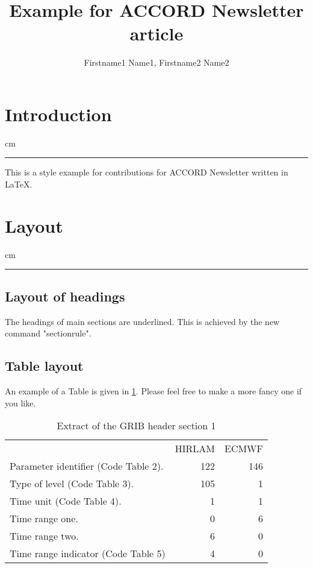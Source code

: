 \documentclass[11pt,a4paper]{article}
\date{}
\title{ Example for ACCORD Newsletter article}
\author{Firstname1 Name1, Firstname2 Name2}
\newcommand {\sectionrule}{\vskip -0.9 cm
\color {mygray} \rule [0 cm] {17 cm}{0.1 mm} \color {black}}
\begin{document}
\maketitle
\thispagestyle{fancy}

\section{Introduction}
\sectionrule

This is a style example for contributions for ACCORD Newsletter written in \LaTeX. 


\section{Layout}
\sectionrule

\subsection{Layout of headings}

The headings of main sections are underlined. This is achieved by the new command "sectionrule".

\subsection{Table layout}

An example of a Table is given in \ref{tab:grib}. Please feel free to make a more fancy one if you like.

\begin{table}
{\center\it\caption{ \label{tab:grib}Extract of the GRIB header section 1}}
\begin{center}
\begin{tabular}{lrr}
                                        & HIRLAM & ECMWF \\
 Parameter identifier (Code Table 2).   &   122  & 146 \\
 Type of level (Code Table 3).          &   105  &   1 \\
 Time unit (Code Table 4).              &     1  &   1 \\
 Time range one.                        &     0  &   6 \\
 Time range two.                        &     6  &   0 \\
 Time range indicator (Code Table 5)    &     4  &   0 \\
\end{tabular}
\end{center}
\end{table} 
\end{document}
